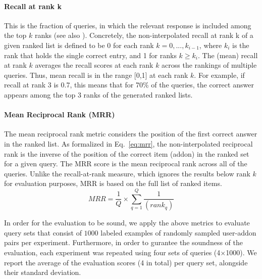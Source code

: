 \documentclass[ijoc,nonblindrev]{informs3} %
\numberwithin{equation}{subsection}
\begin{document}
\paragraph{Recall at rank k}
This is the fraction of queries, in which the relevant response is included among the top $k$ ranks (see also \cite{minkov2010improving}). Concretely, the non-interpolated recall at rank k of a given ranked list is defined to be 0 for each rank $k = 0, ..., k_{i−1}$, where $k_i$ is the rank that holds the single correct entry, and 1 for ranks $k\geq k_i$. The (mean) recall at rank $k$ averages the recall scores at each rank $k$ across the rankings of multiple queries. Thus, mean recall is in the range [0,1] at each rank $k$. For example, if recall at rank 3 is 0.7, this means that for 70\% of the queries, the correct answer appears among the top 3 ranks of the generated ranked lists.

\paragraph{Mean Reciprocal Rank (MRR)}

The mean reciprocal rank metric \citep{voorhees1999trec} considers the position of the first correct answer in the ranked list.  As formalized in Eq.~\eqref{eq:mrr}, the non-interpolated reciprocal rank is the inverse of the position of the correct item (addon) in the ranked set for a given query. The MRR score is the mean reciprocal rank across all of the queries. Unlike the recall-at-rank measure, which ignores the results below rank $k$ for evaluation purposes, MRR is based on the full list of ranked items. 
\begin{equation}
 MRR = \frac{1}{Q} \times \displaystyle\sum\limits_{q=1}^{Q} \frac{1}{(rank_q)}
\label{eq:mrr}
\end{equation}

In order for the evaluation to be sound, we apply the above metrics to evaluate query sets that consist of $1000$ labeled examples of randomly sampled user-addon pairs per experiment. Furthermore, in order to gurantee the soundness of the evaluation, each experiment was repeated using four sets of queries (4$\times$1000). We report the average of the evaluation scores (4 in total) per query set, alongside their standard deviation.  
\end{document}
